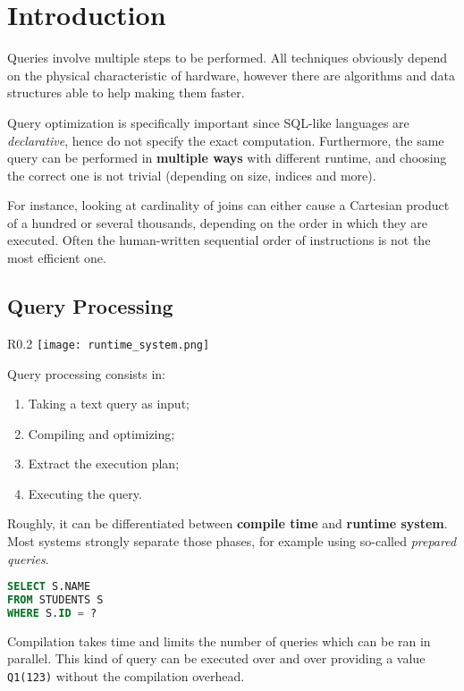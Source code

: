 
\section{Introduction}
Queries involve multiple steps to be performed. All techniques obviously depend on the physical characteristic of hardware, however there are algorithms and data structures able to help making them faster.

Query optimization is specifically important since SQL-like languages are \textit{declarative}, hence do not specify the exact computation. Furthermore, the same query can be performed in \textbf{multiple ways} with different runtime, and choosing the correct one is not trivial (depending on size, indices and more).

For instance, looking at cardinality of joins can either cause a Cartesian product of a hundred or several thousands, depending on the order in which they are executed. Often the human-written sequential order of instructions is not the most efficient one.

\subsection{Query Processing}
\begin{wrapfigure}{R}{0.2\textwidth}
	\vspace{-35pt}
	\texttt{[image: runtime\_system.png]}
	\vspace{-100pt}
\end{wrapfigure}
Query processing consists in: 
\begin{enumerate}
	\item Taking a text query as input;
	\item Compiling and optimizing;
	\item Extract the execution plan;
	\item Executing the query.
\end{enumerate}
Roughly, it can be differentiated between \textbf{compile time} and \textbf{runtime system}. Most systems strongly separate those phases, for example using so-called \textit{prepared queries}.
\begin{lstlisting}[language=SQL]
SELECT S.NAME
FROM STUDENTS S
WHERE S.ID = ?
\end{lstlisting}

Compilation takes time and limits the number of queries which can be ran in parallel. This kind of query can be executed over and over providing a value \texttt{Q1(123)} without the compilation overhead.

